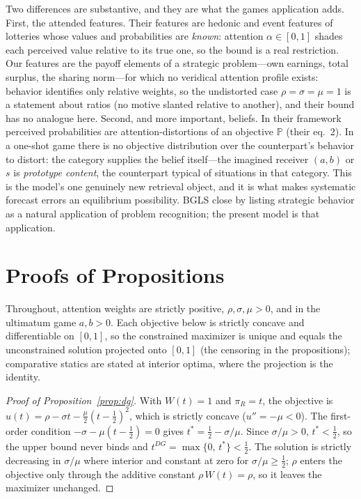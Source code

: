 \documentclass[11pt]{article}
\theoremstyle{plain}
\theoremstyle{remark}
\begin{document}
Two differences are substantive, and they are what the games application adds. First, the attended features. Their features are hedonic and event features of lotteries whose values and probabilities are \emph{known}: attention $\alpha\in[0,1]$ shades each perceived value relative to its true one, so the bound is a real restriction. Our features are the payoff elements of a strategic problem---own earnings, total surplus, the sharing norm---for which no veridical attention profile exists: behavior identifies only relative weights, so the undistorted case $\rho=\sigma=\mu=1$ is a statement about ratios (no motive slanted relative to another), and their bound has no analogue here. Second, and more important, beliefs. In their framework perceived probabilities are attention-distortions of an objective $\mathbb{P}$ (their eq.~2). In a one-shot game there is no objective distribution over the counterpart's behavior to distort: the category supplies the belief itself---the imagined receiver $(a,b)$ or $s$ is \emph{prototype content}, the counterpart typical of situations in that category. This is the model's one genuinely new retrieval object, and it is what makes systematic forecast errors an equilibrium possibility. BGLS close by listing strategic behavior as a natural application of problem recognition; the present model is that application.




\appendix

\section{Proofs of Propositions}
\label{app:proofs}

Throughout, attention weights are strictly positive, $\rho,\sigma,\mu>0$, and in the ultimatum game $a,b>0$. Each objective below is strictly concave and differentiable on $[0,1]$, so the constrained maximizer is unique and equals the unconstrained solution projected onto $[0,1]$ (the censoring in the propositions); comparative statics are stated at interior optima, where the projection is the identity.

\begin{proof}[Proof of Proposition~\ref{prop:dg}]
With $W(t)=1$ and $\pi_R=t$, the objective is $u(t)=\rho-\sigma t-\frac{\mu}{2}\left(t-\frac12\right)^{2}$, which is strictly concave ($u''=-\mu<0$). The first-order condition $-\sigma-\mu\left(t-\frac12\right)=0$ gives $t^{\ast}=\frac12-\sigma/\mu$. Since $\sigma/\mu>0$, $t^{\ast}<\frac12$, so the upper bound never binds and $t^{DG}=\max\{0,\,t^{\ast}\}<\frac12$. The solution is strictly decreasing in $\sigma/\mu$ where interior and constant at zero for $\sigma/\mu\ge\frac12$; $\rho$ enters the objective only through the additive constant $\rho\,W(t)=\rho$, so it leaves the maximizer unchanged.
\end{proof}
\end{document}
